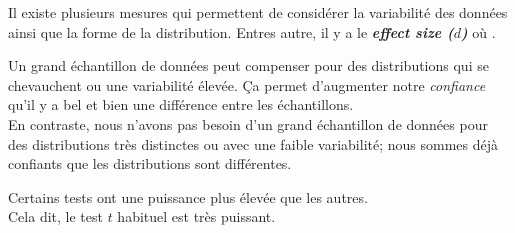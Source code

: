\documentclass[10pt, french]{article}
\begin{document}
\begin{multicols*}{2}
\begin{definitionNOHFILLsub}
\begin{itemize}
\begin{center}
		\end{center}
\end{itemize}
\end{definitionNOHFILLsub}

Il existe plusieurs mesures qui permettent de considérer la variabilité des données ainsi que la forme de la distribution. Entres autre, il y a le \og \textit{\textbf{effect size ($d$)}} \fg{} où .

\begin{definitionNOHFILLsub}
Un grand échantillon de données peut compenser pour des distributions qui se chevauchent ou une variabilité élevée. Ça permet d'augmenter notre \textit{confiance} qu'il y a bel et bien une différence entre les échantillons. \\

En contraste, nous n'avons pas besoin d'un grand échantillon de données pour des distributions très distinctes ou avec une faible variabilité; nous sommes déjà confiants que les distributions sont différentes.
\end{definitionNOHFILLsub}

\begin{definitionNOHFILLsub}
Certains tests ont une puissance plus élevée que les autres. \\
Cela dit, le test $t$ habituel est très puissant.
\end{definitionNOHFILLsub}


\end{multicols*}
\end{document}
